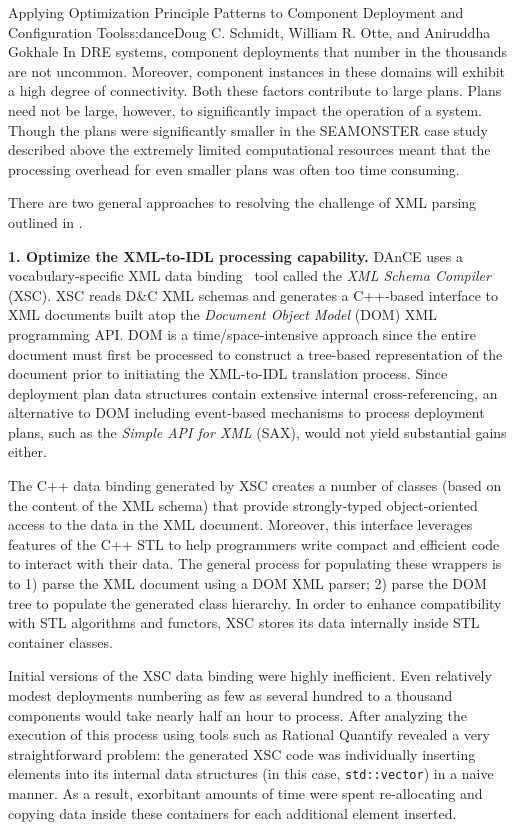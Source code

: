 \begin{aosachapter}{Applying Optimization Principle Patterns to Component Deployment and
                    Configuration Tools}{s:dance}{Doug C. Schmidt, William R. Otte, and Aniruddha Gokhale}
In DRE systems, component deployments that number in the thousands are
not uncommon. Moreover, component instances in these domains will
exhibit a high degree of connectivity. Both these factors contribute to
large plans. Plans need not be large, however, to significantly impact
the operation of a system. Though the plans were significantly smaller
in the SEAMONSTER case study described above the extremely limited
computational resources meant that the processing overhead for even
smaller plans was often too time consuming.


There are two general approaches to resolving the challenge of XML
parsing outlined in .

\textbf{1. Optimize the XML-to-IDL processing capability.} DAnCE uses a
vocabulary-specific XML data binding~\cite{JulesXML:05} tool called the
\emph{XML Schema Compiler} (XSC). XSC reads D\&C XML schemas and generates a
C++-based interface to XML documents built atop the \emph{Document Object
Model} (DOM) XML programming API. DOM is a time/space-intensive approach since
the entire document must first be processed to construct a tree-based
representation of the document prior to initiating the XML-to-IDL translation
process. Since deployment plan data structures contain extensive internal
cross-referencing, an alternative to DOM including event-based mechanisms to
process deployment plans, such as the \emph{Simple API
  for XML} (SAX), would not yield substantial gains either.

The C++ data binding generated by XSC creates a number of classes (based
on the content of the XML schema) that provide strongly-typed
object-oriented access to the data in the XML document. Moreover, this
interface leverages features of the C++ STL to help programmers write
compact and efficient code to interact with their data. The general
process for populating these wrappers is to 1) parse the XML document
using a DOM XML parser; 2) parse the DOM tree to populate the generated
class hierarchy. In order to enhance compatibility with STL algorithms
and functors, XSC stores its data internally inside STL container
classes.

Initial versions of the XSC data binding were highly inefficient. Even
relatively modest deployments numbering as few as several hundred to a
thousand components would take nearly half an hour to process. After
analyzing the execution of this process using tools such as Rational
Quantify revealed a very straightforward problem: the generated XSC code
was individually inserting elements into its internal data structures
(in this case, \texttt{std::vector}) in a naive manner. As a result,
exorbitant amounts of time were spent re-allocating and copying data
inside these containers for each additional element inserted.


\end{aosachapter}
